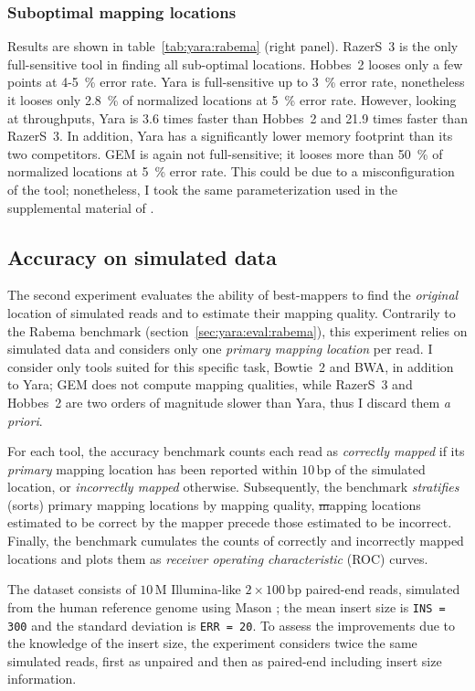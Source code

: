 \subsubsection{Suboptimal mapping locations}
Results are shown in table~\ref{tab:yara:rabema}  (right panel).
RazerS~3 is the only full-sensitive tool in finding all sub-optimal locations.
Hobbes~2 looses only a few points at 4-5~\% error rate.
Yara is full-sensitive up to 3~\% error rate, nonetheless it looses only 2.8~\% of normalized locations at 5~\% error rate.
However, looking at throughputs, Yara is 3.6 times faster than Hobbes~2 and 21.9 times faster than RazerS~3.
In addition, Yara has a significantly lower memory footprint than its two competitors.
GEM is again not full-sensitive; it looses more than 50~\% of normalized locations at 5~\% error rate.
This could be due to a misconfiguration of the tool; nonetheless, I took the same parameterization used in the supplemental material of \citep{MarcoSola2012}.

\subsection{Accuracy on simulated data}
\label{sec:yara:eval:accuracy}

The second experiment evaluates the ability of best-mappers to find the \emph{original} location of simulated reads and to estimate their mapping quality.
Contrarily to the Rabema benchmark (section~\ref{sec:yara:eval:rabema}), this experiment relies on simulated data and considers only one \emph{primary mapping location} per read.
I consider only tools suited for this specific task, \ie Bowtie~2 and BWA, in addition to Yara; GEM does not compute mapping qualities, while RazerS~3 and Hobbes~2 are two orders of magnitude slower than Yara, thus I discard them \emph{a priori}.

For each tool, the accuracy benchmark counts each read as \emph{correctly mapped} if its \emph{primary} mapping location has been reported within $10\,\text{bp}$ of the simulated location, or \emph{incorrectly mapped} otherwise.
Subsequently, the benchmark \emph{stratifies} (\ie sorts) primary mapping locations by mapping quality, \st mapping locations estimated to be correct by the mapper precede those estimated to be incorrect.
Finally, the benchmark cumulates the counts of correctly and incorrectly mapped locations and plots them as \emph{receiver operating characteristic} (ROC) curves.

The dataset consists of $10\,\text{M}$ Illumina-like $2 \times 100\,\text{bp}$ paired-end reads, simulated from the human reference genome using Mason \citep{Holtgrewe2010}; the mean insert size is \texttt{INS = 300} and the standard deviation is \texttt{ERR = 20}.
To assess the improvements due to the knowledge of the insert size, the experiment considers twice the same simulated reads, first as unpaired and then as paired-end including insert size information.

